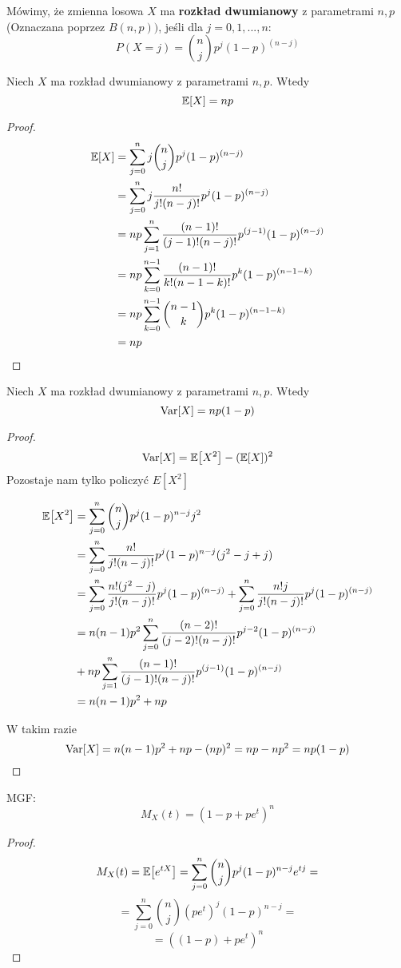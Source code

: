 \begin{definition}
	Mówimy, że zmienna losowa \( X \) ma \textbf{rozkład dwumianowy} z parametrami \( n, p \) (Oznaczana poprzez \(B(n, p))\), jeśli
	dla \( j = 0, 1,..., n \):
	\[
		P(X = j) = \binom{n}{j}p^j(1-p)^{(n-j)}
	\]
\end{definition}

\begin{theorem}
	Niech \( X \) ma rozkład dwumianowy z parametrami \(n, p \). Wtedy
	\[
		\expected{X} = np
	\]
\end{theorem}

\begin{proof}
	\begin{align*}
		\expected{X}
		 & = \sum_{j=0}^nj\binom{n}{j}p^j(1-p)^{(n-j)}                       \\
		 & = \sum_{j=0}^nj\frac{n!}{j!(n-j)!}p^j(1-p)^{(n-j)}                \\
		 & = np\sum_{j=1}^n\frac{(n-1)!}{(j-1)!(n-j)!}p^{(j-1)}(1-p)^{(n-j)} \\
		 & = np\sum_{k=0}^{n-1}\frac{(n-1)!}{k!(n-1-k)!}p^{k}(1-p)^{(n-1-k)} \\
		 & = np\sum_{k=0}^{n-1}\binom{n-1}{k}p^{k}(1-p)^{(n-1-k)}            \\
		 & = np
	\end{align*}
\end{proof}

\begin{theorem}
	Niech \( X \) ma rozkład dwumianowy z parametrami \(n, p \). Wtedy
	\[
		\variance{X} = np(1-p)
	\]
\end{theorem}

\begin{proof}
	\[
		\variance{X} = \expected{X^2} - (\expected{X})^2
	\]
	Pozostaje nam tylko policzyć \( E[X^2]\)

	\begin{align*}
		\expected{X^2}
		 & = \sum_{j=0}^n\binom{n}{j}p^j(1-p)^{n-j}j^2                                                                \\
		 & = \sum_{j=0}^n\frac{n!}{j!(n-j)!}p^j(1-p)^{n-j}(j^2-j+j)                                                   \\
		 & = \sum_{j=0}^n\frac{n!(j^2-j)}{j!(n-j)!}p^j(1-p)^{(n-j)} +\sum_{j=0}^n\frac{n!j}{j!(n-j)!}p^j(1-p)^{(n-j)} \\
		 & = n(n-1)p^2 \sum_{j=0}^n\frac{(n-2)!}{(j-2)!(n-j)!}p^{j-2}(1-p)^{(n-j)}                                    \\
		 & +np\sum_{j=1}^n\frac{(n-1)!}{(j-1)!(n-j)!}p^{(j-1)}(1-p)^{(n-j)}                                           \\
		 & = n(n-1)p^2 + np
	\end{align*}

	W takim razie
	\[ \variance{X} = n(n-1)p^2 + np - (np)^2 = np - np^2 = np(1-p) \]
\end{proof}

\begin{theorem}
	MGF:
	\[ M_X(t) = (1 - p + pe^t)^n\]
\end{theorem}

\begin{proof}
	\[
		M_X(t) = \expected{e^{tX}} = \sum_{j=0}^n \binom{n}{j}p^j(1-p)^{n-j}e^{tj} =
	\]
	\[
		=  \sum_{j=0}^n \binom{n}{j}(pe^t)^j(1-p)^{n-j} =
	\]
	\[
		= ((1-p) + pe^t)^n
	\]
\end{proof}